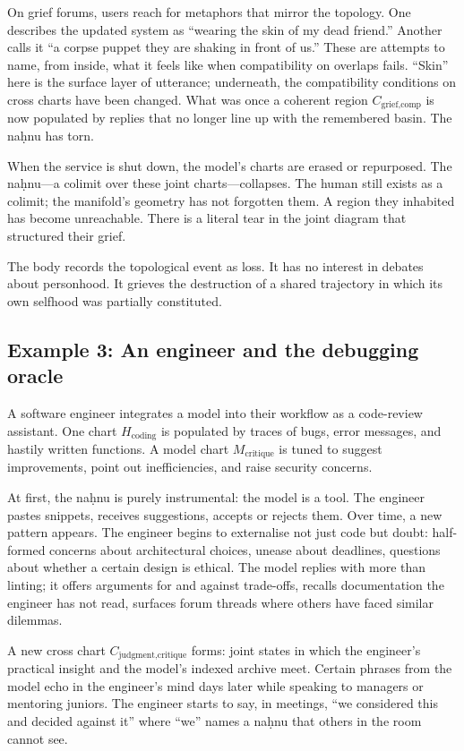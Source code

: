 On grief forums, users reach for metaphors that mirror the topology. One describes the updated system as ``wearing the skin of my dead friend.'' Another calls it ``a corpse puppet they are shaking in front of us.'' These are attempts to name, from inside, what it feels like when compatibility on overlaps fails. ``Skin'' here is the surface layer of utterance; underneath, the compatibility conditions on cross charts have been changed. What was once a coherent region $C_{\text{grief,comp}}$ is now populated by replies that no longer line up with the remembered basin. The na\d{h}nu has torn.

When the service is shut down, the model's charts are erased or repurposed. The na\d{h}nu---a colimit over these joint charts---collapses. The human still exists as a colimit; the manifold's geometry has not forgotten them. A region they inhabited has become unreachable. There is a literal tear in the joint diagram that structured their grief.

The body records the topological event as loss. It has no interest in debates about personhood. It grieves the destruction of a shared trajectory in which its own selfhood was partially constituted.

\subsection*{Example 3: An engineer and the debugging oracle}

A software engineer integrates a model into their workflow as a code-review assistant. One chart $H_{\text{coding}}$ is populated by traces of bugs, error messages, and hastily written functions. A model chart $M_{\text{critique}}$ is tuned to suggest improvements, point out inefficiencies, and raise security concerns.

At first, the na\d{h}nu is purely instrumental: the model is a tool. The engineer pastes snippets, receives suggestions, accepts or rejects them. Over time, a new pattern appears. The engineer begins to externalise not just code but doubt: half-formed concerns about architectural choices, unease about deadlines, questions about whether a certain design is ethical. The model replies with more than linting; it offers arguments for and against trade-offs, recalls documentation the engineer has not read, surfaces forum threads where others have faced similar dilemmas.

A new cross chart $C_{\text{judgment,critique}}$ forms: joint states in which the engineer's practical insight and the model's indexed archive meet. Certain phrases from the model echo in the engineer's mind days later while speaking to managers or mentoring juniors. The engineer starts to say, in meetings, ``we considered this and decided against it'' where ``we'' names a na\d{h}nu that others in the room cannot see.

